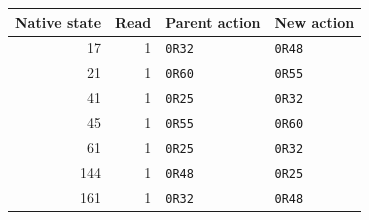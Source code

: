 \begin{center}\small
\begin{tabular}{rrll}
\toprule
Native state & Read & Parent action & New action\\
\midrule
17&1&\texttt{0R32}&\texttt{0R48}\\
21&1&\texttt{0R60}&\texttt{0R55}\\
41&1&\texttt{0R25}&\texttt{0R32}\\
45&1&\texttt{0R55}&\texttt{0R60}\\
61&1&\texttt{0R25}&\texttt{0R32}\\
144&1&\texttt{0R48}&\texttt{0R25}\\
161&1&\texttt{0R32}&\texttt{0R48}\\
\bottomrule
\end{tabular}
\end{center}
